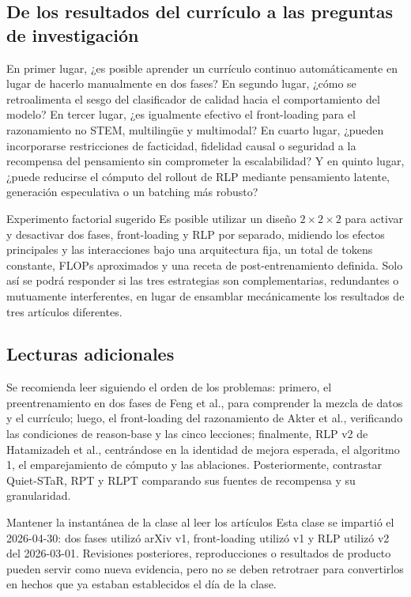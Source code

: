 \documentclass[a4paper]{article}
\begin{document}
\subsection{De los resultados del currículo a las preguntas de investigación}

En primer lugar, ¿es posible aprender un currículo continuo automáticamente en lugar de hacerlo manualmente en dos fases? En segundo lugar, ¿cómo se retroalimenta el sesgo del clasificador de calidad hacia el comportamiento del modelo? En tercer lugar, ¿es igualmente efectivo el front-loading para el razonamiento no STEM, multilingüe y multimodal? En cuarto lugar, ¿pueden incorporarse restricciones de facticidad, fidelidad causal o seguridad a la recompensa del pensamiento sin comprometer la escalabilidad? Y en quinto lugar, ¿puede reducirse el cómputo del rollout de RLP mediante pensamiento latente, generación especulativa o un batching más robusto?

\begin{knowledgebox}{Experimento factorial sugerido}
Es posible utilizar un diseño $2\times2\times2$ para activar y desactivar dos fases, front-loading y RLP por separado, midiendo los efectos principales y las interacciones bajo una arquitectura fija, un total de tokens constante, FLOPs aproximados y una receta de post-entrenamiento definida. Solo así se podrá responder si las tres estrategias son complementarias, redundantes o mutuamente interferentes, en lugar de ensamblar mecánicamente los resultados de tres artículos diferentes.
\end{knowledgebox}

\subsection{Lecturas adicionales}

Se recomienda leer siguiendo el orden de los problemas: primero, el preentrenamiento en dos fases de Feng et al., para comprender la mezcla de datos y el currículo; luego, el front-loading del razonamiento de Akter et al., verificando las condiciones de reason-base y las cinco lecciones; finalmente, RLP v2 de Hatamizadeh et al., centrándose en la identidad de mejora esperada, el algoritmo 1, el emparejamiento de cómputo y las ablaciones. Posteriormente, contrastar Quiet-STaR, RPT y RLPT comparando sus fuentes de recompensa y su granularidad.

\begin{warningbox}{Mantener la instantánea de la clase al leer los artículos}
Esta clase se impartió el 2026-04-30: dos fases utilizó arXiv v1, front-loading utilizó v1 y RLP utilizó v2 del 2026-03-01. Revisiones posteriores, reproducciones o resultados de producto pueden servir como nueva evidencia, pero no se deben retrotraer para convertirlos en hechos que ya estaban establecidos el día de la clase.
\end{warningbox}
\end{document}
